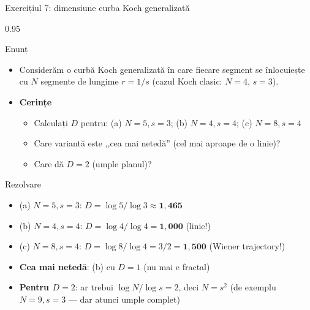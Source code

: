 \documentclass[9pt, aspectratio=169, t]{beamer}
\begin{document}
\begin{frame}[shrink=15]{Exercițiul 7: dimensiune curba Koch generalizată}
\begin{cminipage}{0.95\textwidth}
\begin{block}{Enunț}
\begin{itemize}\setlength{\itemsep}{0pt}
    \item Considerăm o curbă Koch generalizată în care fiecare segment se înlocuiește cu $N$ segmente de lungime $r=1/s$ (cazul Koch clasic: $N=4$, $s=3$).
\end{itemize}
\end{block}
\begin{itemize}\setlength{\itemsep}{0pt}
    \item \textbf{Cerințe}
    \begin{itemize}\setlength{\itemsep}{0pt}
        \item Calculați $D$ pentru: (a) $N=5,s=3$; (b) $N=4,s=4$; (c) $N=8,s=4$
        \item Care variantă este ,,cea mai netedă'' (cel mai aproape de o linie)?
        \item Care dă $D=2$ (umple planul)?
    \end{itemize}
\end{itemize}
\begin{exampleblock}{Rezolvare}
\begin{itemize}\setlength{\itemsep}{0pt}
    \item (a) $N=5,s=3$: $D=\log 5/\log 3\approx \mathbf{1{,}465}$
    \item (b) $N=4,s=4$: $D=\log 4/\log 4=\mathbf{1{,}000}$ (linie!)
    \item (c) $N=8,s=4$: $D=\log 8/\log 4=3/2=\mathbf{1{,}500}$ (Wiener trajectory!)
    \item \textbf{Cea mai netedă}: (b) cu $D=1$ (nu mai e fractal)
    \item \textbf{Pentru $D=2$}: ar trebui $\log N/\log s=2$, deci $N=s^2$ (de exemplu $N=9,s=3$ --- dar atunci umple complet)
\end{itemize}
\end{exampleblock}
\end{cminipage}
\end{frame}
\end{document}
